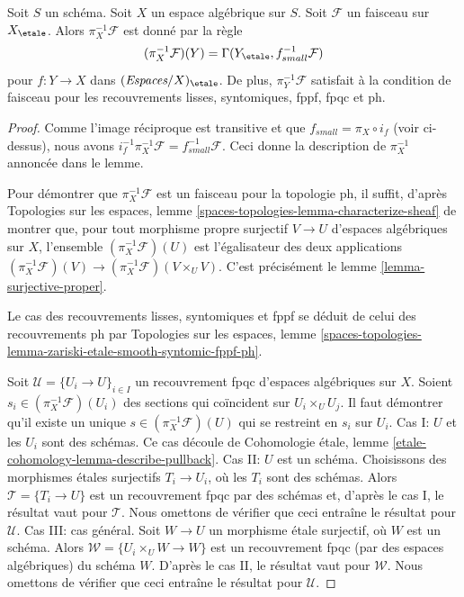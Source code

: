\begin{lemma}
\label{lemma-describe-pullback}
Soit $S$ un schéma. Soit $X$ un espace algébrique sur $S$.
Soit $\mathcal{F}$ un faisceau sur $X_\etale$. Alors
$\pi_X^{-1}\mathcal{F}$ est donné par la règle
$$
(\pi_X^{-1}\mathcal{F})(Y) = \Gamma(Y_\etale, f_{small}^{-1}\mathcal{F})
$$
pour $f : Y \to X$ dans $(\textit{Espaces}/X)_\etale$.
De plus, $\pi_Y^{-1}\mathcal{F}$ satisfait à la condition de faisceau pour les
recouvrements lisses, syntomiques, fppf, fpqc et ph.
\end{lemma}

\begin{proof}
Comme l'image réciproque est transitive et que $f_{small} = \pi_X \circ i_f$
(voir ci-dessus), nous avons
$i_f^{-1} \pi_X^{-1}\mathcal{F} = f_{small}^{-1}\mathcal{F}$.
Ceci donne la description de $\pi_X^{-1}$ annoncée dans le lemme.

\medskip\noindent
Pour démontrer que $\pi_X^{-1}\mathcal{F}$ est un faisceau pour la topologie ph,
il suffit, d'après Topologies sur les espaces, lemme
\ref{spaces-topologies-lemma-characterize-sheaf}
de montrer que, pour tout morphisme propre surjectif
$V \to U$ d'espaces algébriques sur $X$, l'ensemble
$(\pi_X^{-1}\mathcal{F})(U)$ est l'égalisateur des deux applications
$(\pi_X^{-1}\mathcal{F})(V) \to (\pi_X^{-1}\mathcal{F})(V \times_U V)$.
C'est précisément le lemme \ref{lemma-surjective-proper}.

\medskip\noindent
Le cas des recouvrements lisses, syntomiques et fppf se déduit de celui
des recouvrements ph par Topologies sur les espaces, lemme
\ref{spaces-topologies-lemma-zariski-etale-smooth-syntomic-fppf-ph}.

\medskip\noindent
Soit $\mathcal{U} = \{U_i \to U\}_{i \in I}$ un recouvrement fpqc d'espaces
algébriques sur $X$. Soient $s_i \in (\pi_X^{-1}\mathcal{F})(U_i)$ des sections
qui coïncident sur $U_i \times_U U_j$. Il faut démontrer qu'il existe un unique
$s \in (\pi_X^{-1}\mathcal{F})(U)$ qui se restreint en $s_i$ sur $U_i$.
Cas I: $U$ et les $U_i$ sont des schémas. Ce cas découle de
Cohomologie étale, lemme \ref{etale-cohomology-lemma-describe-pullback}.
Cas II: $U$ est un schéma. Choisissons des morphismes étales surjectifs
$T_i \to U_i$, où les $T_i$ sont des schémas. Alors
$\mathcal{T} = \{T_i \to U\}$ est un recouvrement fpqc par des schémas et,
d'après le cas I, le résultat vaut pour $\mathcal{T}$. Nous omettons de vérifier
que ceci entraîne le résultat pour $\mathcal{U}$.
Cas III: cas général. Soit $W \to U$ un morphisme étale surjectif, où $W$ est
un schéma. Alors $\mathcal{W} = \{U_i \times_U W \to W\}$ est un recouvrement
fpqc (par des espaces algébriques) du schéma $W$.
D'après le cas II, le résultat vaut pour $\mathcal{W}$. Nous omettons de vérifier
que ceci entraîne le résultat pour $\mathcal{U}$.
\end{proof}

